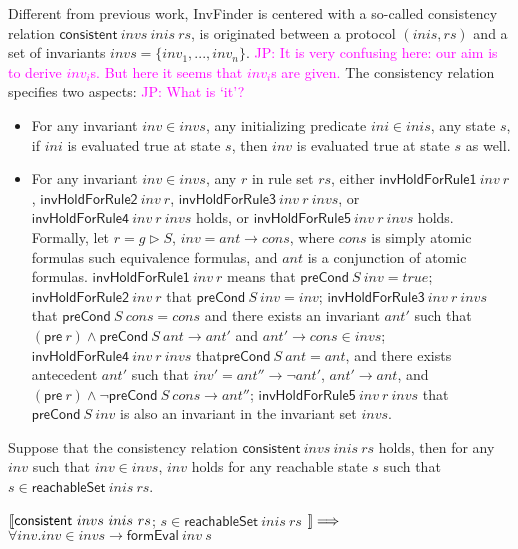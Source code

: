 \documentclass{llncs}
\newcommand\JP[1]{\textcolor{magenta}{JP: #1}}
\begin{document}
Different from previous work, {\sf InvFinder} is centered with a
so-called consistency relation $\mathsf{consistent}~ invs ~inis~
rs$, is originated between a protocol $(inis,rs)$ and a set of
invariants $invs=\{inv_1,..., inv_n\}$. \JP{It is very confusing
here: our aim is to derive $inv_i$s. But here it seems that $inv_i$s
are given.} The consistency relation specifies two aspects: \JP{What
is `it'?}
%
\begin{itemize}
\item For any invariant $inv \in invs$,
any initializing predicate $ini \in inis$, any
state $s$, if $ini$ is evaluated true at state $s$, then $inv$ is
evaluated true at state $s$ as well.

\item For any invariant $inv \in invs$, any $r$ in rule set
$rs$, either $\mathsf{invHoldForRule1 }~inv~ r$,
$\mathsf{invHoldForRule2 }~inv~ r$, $\mathsf{invHoldForRule3 }~inv~
r~invs$, or $\mathsf{invHoldForRule4 }~inv~ r~invs$ holds, or
$\mathsf{invHoldForRule5}~inv~ r~invs$ holds. Formally, let $r=g
\vartriangleright  S$, $inv=ant \longrightarrow cons$, where $cons$
is simply atomic formulas such equivalence formulas, and $ant$ is a
conjunction of atomic formulas. $\mathsf{invHoldForRule1 }~inv~ r$
means that
 $\mathsf{preCond}~S~inv=true$; $\mathsf{invHoldForRule2 }~inv~ r$ that  $\mathsf{preCond}~S~inv=inv$; $\mathsf{invHoldForRule3 }~inv~ r~invs$
  that $\mathsf{preCond}~S~cons=cons$ and there exists an invariant $ant'$ such that
$(\mathsf{pre}~r )\wedge \mathsf{preCond}~S~ant \longrightarrow  ant'$ and $ant' \longrightarrow cons \in invs$; $\mathsf{invHoldForRule4}~inv~ r~invs$
  that$\mathsf{preCond}~S~ant=ant$, and there exists   antecedent $ant'$
such that $inv'=ant'' \longrightarrow \neg ant'$, $ant' \longrightarrow ant$, and
$(\mathsf{pre}~r )\wedge \neg \mathsf{preCond}~S~cons \longrightarrow  ant''$; $\mathsf{invHoldForRule5}~inv~ r~invs$ that
$\mathsf{preCond}~S~inv$ is also an invariant in the invariant set $invs$.
\end{itemize}

Suppose that the consistency relation $\mathsf{consistent}~ invs ~inis~ rs$ holds, then for any $inv$ such that $inv \in invs$, $inv$ holds for any reachable state $s$ such that $s  \in \mathsf{reachableSet}~ inis~ rs$.
\begin{theorem}\label{consistentLemma}
  $\emph{$\mathopen{\lbrack\mkern-3mu\lbrack}$} \mathsf{consistent}~ invs ~inis~ rs$; $s  \in \mathsf{reachableSet}~ inis~ rs$
  $\emph{$\mathclose{\rbrack\mkern-3mu\rbrack}$}\Longrightarrow$ $\forall inv. inv \in invs \longrightarrow
\mathsf{formEval}~ inv ~s$    \end{theorem}
\end{document}
